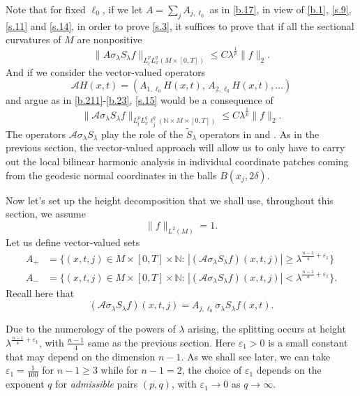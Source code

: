 \documentclass[10pt]{amsart}
\newcommand{\la}{\lambda}
\newcommand{\e}{\varepsilon}
\newcommand{\1}{{\bf 1}}
\newcommand{\A}{{\mathcal A}}
\newcommand{\N}{{\mathbb N}}
\begin{document}
Note that for fixed $\ell_0$, if we let $A= \sum_{j}A_{j,\ell_0}$ as in \eqref{b.17}, in view of \eqref{b.1}, \eqref{s.9}, \eqref{s.11} and \eqref{s.14}, in order
to prove \eqref{s.3}, it suffices to
prove that if all the sectional curvatures of
$M$ are nonpositive
\begin{equation}\label{s.15}
\| A \sigma_\la S_\la f\|_{L^p_tL^q_x(M\times [0,T])}\le C\la^{\frac1{p}}\|f\|_2.
\end{equation}
And if we consider the vector-valued operators
\begin{equation}\label{s.16}
\A H(x,t)=(A_{1,\ell_0}H(x,t), \, A_{2,\ell_0}H(x,t),\dots)
\end{equation}
and argue as in \eqref{b.211}-\eqref{b.23}, \eqref{s.15} would be a consequence of 
\begin{equation}\label{s.17}
\| \A \sigma_\la S_\la f\|_{L^p_tL^q_x\ell^q_j(\N\times M\times [0,T])}\le C\la^{\frac1{p}}\|f\|_2.
\end{equation}
The operators $\A \sigma_\la S_\la$ play the role of the $\tilde S_\la$ operators in \cite{blair2023strichartz} and \cite{HSst}. As in the previous section,  
 the vector-valued approach will allow us to only have to carry out the local bilinear harmonic analysis
in individual coordinate patches coming from the geodesic normal coordinates in the balls $B(x_j,2\delta)$.


Now let's set up the height decomposition that we shall use, throughout this section, we assume
\begin{equation}\label{s.norm}
\|f\|_{L^2(M)}=1.
\end{equation}
Let us
define vector-valued sets
\begin{equation}\label{s.18}
\begin{split}
A_+&= \{(x, t, j)\in M\times [0,T]\times \N: \, |(\A \sigma_\la S_\la f)
(x,t,j)|\ge \la^{\frac{n-1}4+\e_1}\}
\\
A_-&=\{(x, t, j)\in M\times [0,T]\times \N: \, |(\A \sigma_\la S_\la f)
(x, t, j)|< \la^{\frac{n-1}4+\e_1}\}.
\end{split}
\end{equation}
Recall here that
\begin{equation}\label{s.18a}
(\A \sigma_\la S_\la f)(x, t, j)=A_{j,\ell_0}
\sigma_\la S_\la f(x, t).
\end{equation}


Due to the numerology of the powers of $\la$ arising,
the splitting occurs at height $\la^{\frac{n-1}4+\e_1}$, with $\frac{n-1}{4}$ same as the previous section. Here $\e_1>0$ is a small constant that may depend on the dimension $n-1$. As we shall see later, we can take $\e_1=\frac 1{100}$ for $n-1\ge 3$ while  for $n-1=2$, the choice of $\e_1$ depends on the exponent $q$ for {\em {admissible}} pairs $(p,q)$, with $\e_1\rightarrow 0$ as $q\rightarrow \infty$.
\end{document}
